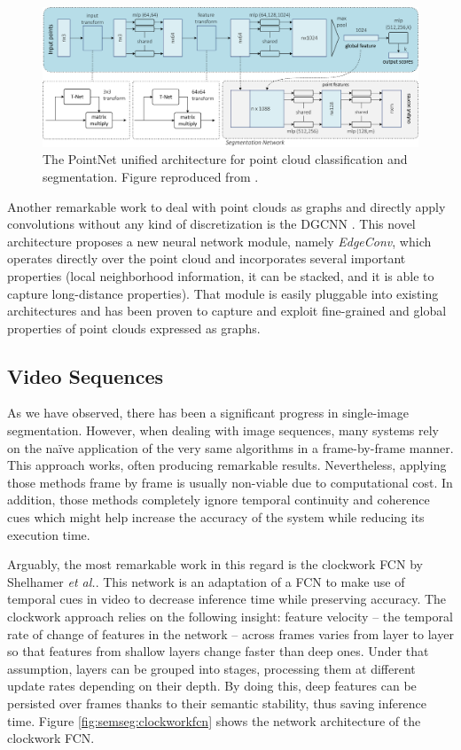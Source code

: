 \begin{figure}[!t]
	\centering
	\includegraphics[width=0.9\linewidth]{Figures/Segmentation/pointnetarchitecture_rework}
	\caption{The PointNet unified architecture for point cloud classification and segmentation. Figure reproduced from \cite{Qi2016}.}
	\label{fig:semseg:pointnetarchitecture}
\end{figure}

Another remarkable work to deal with point clouds as graphs and directly apply convolutions without any kind of discretization is the \ac{DGCNN} \cite{Wang2018}. This novel architecture proposes a new neural network module, namely \emph{EdgeConv}, which operates directly over the point cloud and incorporates several important properties (local neighborhood information, it can be stacked, and it is able to capture long-distance properties). That module is easily pluggable into existing architectures and has been proven to capture and exploit fine-grained and global properties of point clouds expressed as graphs.

\subsection{Video Sequences}

As we have observed, there has been a significant progress in single-image segmentation. However, when dealing with image sequences, many systems rely on the naïve application of the very same algorithms in a frame-by-frame manner. This approach works, often producing remarkable results. Nevertheless, applying those methods frame by frame is usually non-viable due to computational cost. In addition, those methods completely ignore temporal continuity and coherence cues which might help increase the accuracy of the system while reducing its execution time.

Arguably, the most remarkable work in this regard is the clockwork \ac{FCN} by Shelhamer \emph{et al.}\cite{Shelhamer2016}. This network is an adaptation of a \ac{FCN} to make use of temporal cues in video to decrease inference time while preserving accuracy. The clockwork approach relies on the following insight: feature velocity -- the temporal rate of change of features in the network -- across frames varies from layer to layer so that features from shallow layers change faster than deep ones. Under that assumption, layers can be grouped into stages, processing them at different update rates depending on their depth. By doing this, deep features can be persisted over frames thanks to their semantic stability, thus saving inference time. Figure \ref{fig:semseg:clockworkfcn} shows the network architecture of the clockwork \ac{FCN}.

